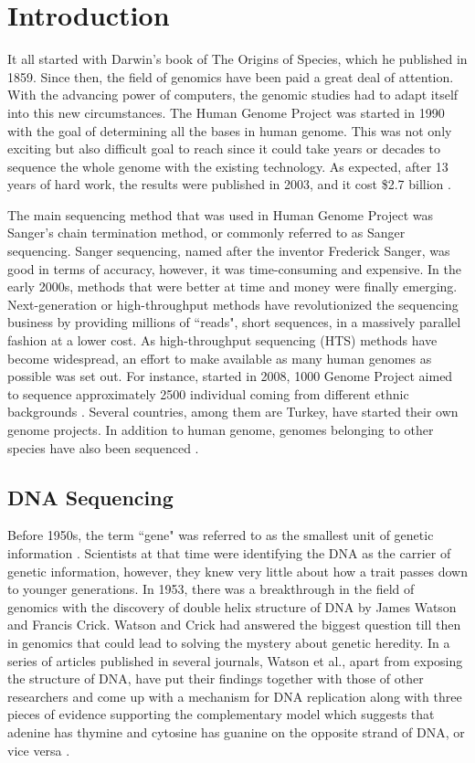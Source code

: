 \chapter{Introduction}

It all started with Darwin's book of The Origins of Species, which he published in 1859. Since then, the field of genomics have been paid a great deal of attention. With the advancing power of computers, the genomic studies had to adapt itself into this new circumstances. The Human Genome Project was started in 1990 with the goal of determining all the bases in human genome. This was not only exciting but also difficult goal to reach since it could take years or decades to sequence the whole genome with the existing technology. As expected, after 13 years of hard work, the results were published in 2003, and it cost \$2.7 billion \cite{costOfHumanGenomeProject}.

The main sequencing method that was used in Human Genome Project was Sanger's chain termination method, or commonly referred to as Sanger sequencing. Sanger sequencing, named after the inventor Frederick Sanger, was good in terms of accuracy, however, it was time-consuming and expensive. In the early 2000s, methods that were better at time and money were finally emerging. Next-generation or high-throughput methods have revolutionized the sequencing business by providing millions of ``reads", short sequences, in a massively parallel fashion at a lower cost. As high-throughput sequencing (HTS) methods have become widespread, an effort to make available as many human genomes as possible was set out. For instance, started in 2008, 1000 Genome Project aimed to sequence approximately 2500 individual coming from different ethnic backgrounds \cite{10002015global}. Several countries, among them are Turkey, have started their own genome projects. In addition to human genome, genomes belonging to other species have also been sequenced \cite{koepfli2015genome}. 

\section{DNA Sequencing}

Before 1950s, the term ``gene" was referred to as the smallest unit of genetic information \cite{crickpapers}. Scientists at that time were identifying the DNA as the carrier of genetic information, however, they knew very little about how a trait passes down to younger generations. In 1953, there was a breakthrough in the field of genomics with the discovery of double helix structure of DNA by James Watson and Francis Crick. Watson and Crick had answered the biggest question till then in genomics that could lead to solving the mystery about genetic heredity. In a series of articles published in several journals, Watson et al., apart from exposing the structure of DNA, have put their findings together with those of other researchers and come up with a mechanism for DNA replication along with three pieces of evidence supporting the complementary model which suggests that adenine has thymine and cytosine has guanine on the opposite strand of DNA, or vice versa \cite{watson1953structure}.

